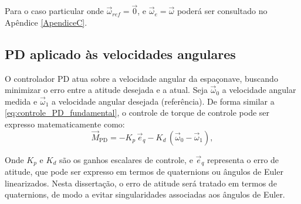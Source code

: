 Para o caso particular onde $\vec{\omega}_{ref}=\vec{0}$, e
$\vec{\omega}_e=\vec{\omega}$ poderá ser consultado no Apêndice \ref{ApendiceC}.

\subsection{PD aplicado às velocidades angulares}
O controlador PD atua sobre a velocidade angular da espaçonave, buscando minimizar o erro entre a atitude desejada e a atual.
Seja $\vec{\omega}_0$ a velocidade angular medida e $\vec{\omega}_1$ a velocidade angular desejada (referência).
De forma similar a \eqref{eq:controle_PD_fundamental}, o controle de torque de controle pode ser expresso matematicamente como:
\begin{equation}
\vec{M}_{\text{PD}} = -K_p \, \vec{e}_q - K_d \, (\vec{\omega}_0 - \vec{\omega}_1),
\label{eq:torque_PD}
\end{equation}

Onde $K_p$ e $K_d$ são os ganhos escalares de controle, e $\vec{e}_q$ representa o erro de atitude, que pode ser expresso em termos de quaternions ou ângulos de Euler linearizados.  
Nesta dissertação, o erro de atitude será tratado em termos de quaternions, de modo a evitar singularidades associadas aos ângulos de Euler.